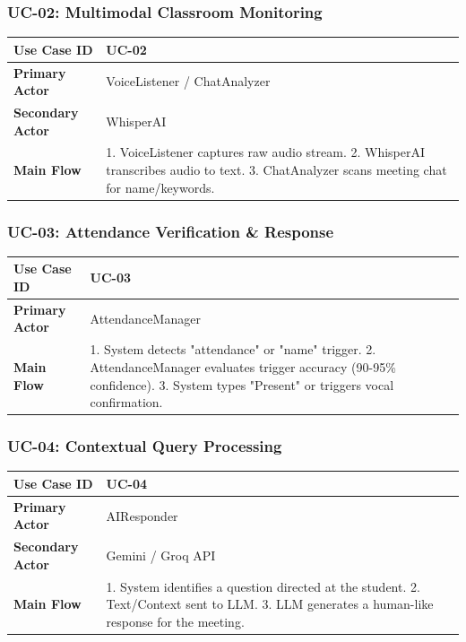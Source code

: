 \documentclass[12pt]{article}
\begin{document}
\subsubsection{UC-02: Multimodal Classroom Monitoring}
\begin{longtable}{|p{4cm}|p{10cm}|}
\hline
\textbf{Use Case ID} & UC-02 \\ \hline
\textbf{Primary Actor} & VoiceListener / ChatAnalyzer \\ \hline
\textbf{Secondary Actor} & WhisperAI \\ \hline
\textbf{Main Flow} & 1. VoiceListener captures raw audio stream. 2. WhisperAI transcribes audio to text. 3. ChatAnalyzer scans meeting chat for name/keywords. \\ \hline
\end{longtable}

\subsubsection{UC-03: Attendance Verification \& Response}
\begin{longtable}{|p{4cm}|p{10cm}|}
\hline
\textbf{Use Case ID} & UC-03 \\ \hline
\textbf{Primary Actor} & AttendanceManager \\ \hline
\textbf{Main Flow} & 1. System detects "attendance" or "name" trigger. 2. AttendanceManager evaluates trigger accuracy (90-95\% confidence). 3. System types "Present" or triggers vocal confirmation. \\ \hline
\end{longtable}

\subsubsection{UC-04: Contextual Query Processing}
\begin{longtable}{|p{4cm}|p{10cm}|}
\hline
\textbf{Use Case ID} & UC-04 \\ \hline
\textbf{Primary Actor} & AIResponder \\ \hline
\textbf{Secondary Actor} & Gemini / Groq API \\ \hline
\textbf{Main Flow} & 1. System identifies a question directed at the student. 2. Text/Context sent to LLM. 3. LLM generates a human-like response for the meeting. \\ \hline
\end{longtable}
\end{document}
